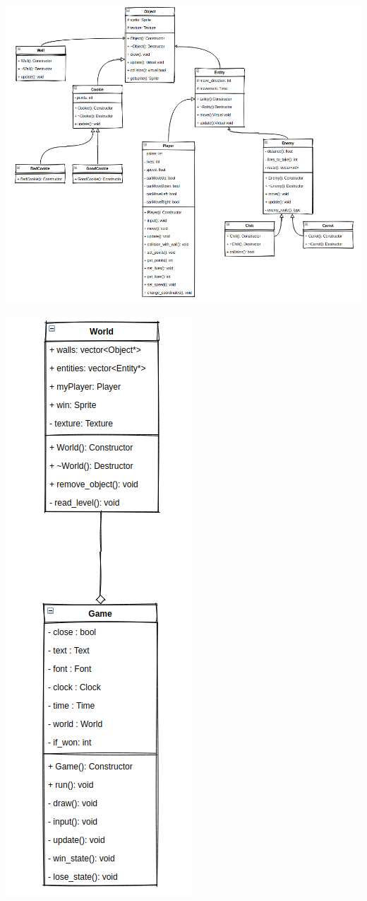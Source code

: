\documentclass{TDP005mall}
\begin{document}
\begin{center}
\includegraphics[scale=0.45]{umlObj.png}
\end{center}
\newpage
\begin{center}
\includegraphics[scale = 0.5]{umlState.png}
\end{center}
\end{document}
